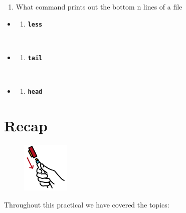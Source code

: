 \documentclass[
  letterpaper,
  DIV=11,
  numbers=noendperiod]{scrreprt}
\providecommand{\tightlist}{%
  \setlength{\itemsep}{0pt}\setlength{\parskip}{0pt}}\usepackage{longtable,booktabs,array}
\begin{document}
\begin{enumerate}
\def\labelenumi{\arabic{enumi}.}
\setcounter{enumi}{5}
\tightlist
\item
  What command prints out the bottom n lines of a file
\end{enumerate}

\begin{itemize}
\item
  \begin{enumerate}
  \def\labelenumi{(\Alph{enumi})}
  \tightlist
  \item
    \textbf{\texttt{less}}\strut \\
  \end{enumerate}
\item
  \begin{enumerate}
  \def\labelenumi{(\Alph{enumi})}
  \setcounter{enumi}{1}
  \tightlist
  \item
    \textbf{\texttt{tail}}\strut \\
  \end{enumerate}
\item
  \begin{enumerate}
  \def\labelenumi{(\Alph{enumi})}
  \setcounter{enumi}{2}
  \tightlist
  \item
    \textbf{\texttt{head}}
  \end{enumerate}
\end{itemize}

\hypertarget{recap}{%
\chapter{Recap}\label{recap}}

\begin{figure}

{\centering \includegraphics[width=0.2\textwidth,height=\textheight]{figures/recap.png}

}

\end{figure}

Throughout this practical we have covered the topics:
\end{document}
